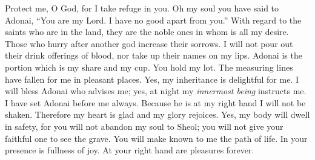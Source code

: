 \begin{biblechapter} %
 Protect me, O God, 
for I take refuge in you.
\verse Oh my soul you have said to Adonai, “You are my Lord. 
I have no good apart from you.”
\verse With regard to the saints who are in the land, 
they are the noble ones in whom is all my desire.
\verse Those who hurry after another god increase their sorrows. 
I will not pour out their drink offerings of blood, 
nor take up their names on my lips.
\verse Adonai is the portion which is my share and my cup. 
You hold my lot.
\verse The measuring lines have fallen for me in pleasant places. 
Yes, my inheritance is delightful for me.
\verse I will bless Adonai who advises me; 
yes, at night my \textit{innermost being} instructs me.
\verse I have set Adonai before me always. 
Because he is at my right hand I will not be shaken.
\verse Therefore my heart is glad and my glory rejoices. 
Yes, my body will dwell in safety,
\verse for you will not abandon my soul to Sheol; 
you will not give your faithful one to see the grave.
\verse You will make known to me the path of life. 
In your presence is fullness of joy. 
At your right hand are pleasures forever.
\end{biblechapter}

